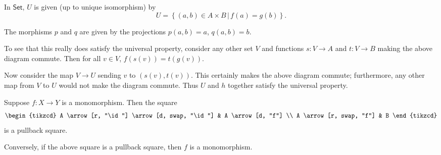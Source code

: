 \documentclass[notes.tex]{subfiles}
\begin{document}
\begin{example}
  In $\mathsf{Set}$, $U$ is given (up to unique isomorphism) by
  \begin{equation*}
    U = \left\{ (a,b) \in A \times B \,\big|\, f(a) = g(b) \right\}.
  \end{equation*}

  The morphisms $p$ and $q$ are given by the projections $p(a,b) = a$, $q(a,b) = b$.

  To see that this really does satisfy the universal property, consider any other set $V$ and functions $s\colon V \to A$ and $t\colon V \to B$ making the above diagram commute. Then for all $v \in V$, $f(s(v)) = t(g(v))$.

  Now consider the map $V \to U$ sending $v$ to $(s(v), t(v))$. This certainly makes the above diagram commute; furthermore, any other map from $V$ to $U$ would not make the diagram commute. Thus $U$ and $h$ together satisfy the universal property.
\end{example}

\begin{example}
  Suppose $f\colon X \to Y$ is a monomorphism. Then the square
  \begin{equation*}
    \begin{tikzcd}
      A
      \arrow[r, "\id"]
      \arrow[d, swap, "\id"]
      & A
      \arrow[d, "f"]
      \\
      A
      \arrow[r, swap, "f"]
      & B
    \end{tikzcd}
  \end{equation*}
  is a pullback square.

  Conversely, if the above square is a pullback square, then $f$ is a monomorphism.
\end{example}
\end{document}
